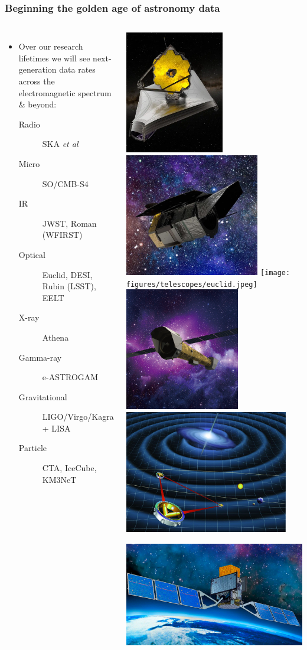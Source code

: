 \documentclass[aspectratio=169, handout]{beamer}
\begin{document}
\begin{frame}
    \frametitle{Beginning the golden age of astronomy data}
    \begin{columns}
        \begin{itemize}
            \item Over our research lifetimes we will see next-generation data rates across the electromagnetic spectrum \& beyond:
                \begin{description}
                    \item[Radio] SKA \textit{et al}
                    \item[Micro] SO/CMB-S4
                    \item[IR] JWST, Roman (WFIRST)
                    \item[Optical] Euclid, DESI, Rubin (LSST), EELT
                    \item[X-ray] Athena
                    \item[Gamma-ray] e-ASTROGAM
                    \item[Gravitational] LIGO/Virgo/Kagra + LISA
                    \item[Particle] CTA, IceCube, KM3NeT
                \end{description}
        \end{itemize}

        \includegraphics[height=0.145\textwidth]{figures/telescopes/jwst.png}%
        \includegraphics[height=0.145\textwidth]{figures/telescopes/roman.jpg}%
        \texttt{[image: figures/telescopes/euclid.jpeg]}%
        \includegraphics[height=0.145\textwidth]{figures/telescopes/athena.jpg}%
        \includegraphics[height=0.145\textwidth]{figures/telescopes/lisa.jpg}%
        \includegraphics[height=0.145\textwidth]{figures/telescopes/e-ASTROGAM.pdf}%
        \vspace{-1pt}


\end{columns}
\end{frame}
\end{document}

